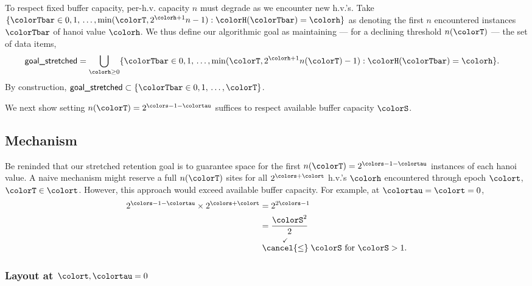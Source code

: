 To respect fixed buffer capacity, per-h.v. capacity $n$ must degrade as we encounter new h.v.'s.
Take $\{ \colorTbar \in 0, 1, \, \ldots, \min(\colorT, 2^{\colorh + 1}n - 1) : \colorH(\colorTbar) = \colorh \}$ as denoting the first $n$ encountered instances $\colorTbar$ of hanoi value $\colorh$.
We thus define our algorithmic goal as maintaining --- for a declining threshold $n(\colorT)$ --- the set of data items,
\begin{align*}
\textsf{goal\_stretched}
&=
\bigcup_{\colorh \geq 0}
\{ \colorTbar \in 0, 1, \, \ldots, \min(\colorT, 2^{\colorh + 1}n(\colorT) - 1) : \colorH(\colorTbar) = \colorh \}.
\end{align*}
By construction, $\textsf{goal\_stretched} \subset \{ \colorTbar \in 0, 1, \, \ldots, \colorT \}$.

We next show setting $n(\colorT) = 2^{\colors - 1 - \colortau}$ suffices to respect available buffer capacity $\colorS$.





\subsection{Mechanism}



Be reninded that our stretched retention goal is to guarantee space for the first $n(\colorT) =  2^{\colors - 1 - \colortau}$ instances of each hanoi value.
A naive mechanism might reserve a full $n(\colorT)$ sites for all $2^{\colors + \colort}$ h.v.'s $\colorh$ encountered through epoch $\colort$, $\colorT \in \colort$.
However, this approach would exceed available buffer capacity.
For example, at $\colortau=\colort=0$,
\begin{align*}
2^{\colors - 1 - \colortau} \times 2^{\colors + \colort}
&=
2^{2\colors - 1}\\
&=
\frac{\colorS^{2}}{2}\\
&\stackrel{\checkmark}{\cancel{\leq}} \colorS \text{ for } \colorS > 1.
\end{align*}

\subsubsection{Layout at $\colort,\colortau=0$}

